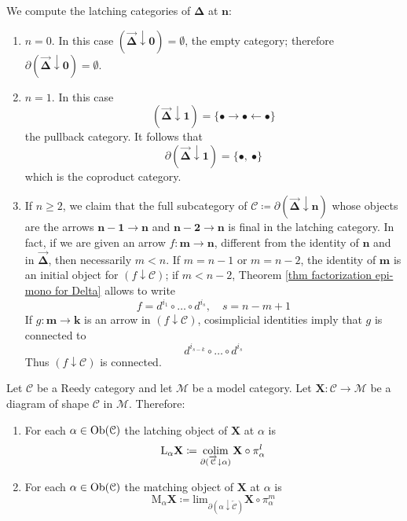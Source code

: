 \begin{refsection}
\begin{eg} \label{eg computing latching categories}
We compute the latching categories of $\boldsymbol\Delta$ at $\mathbf n$:
\begin{enumerate}
\item $n = 0$. In this case $( \overrightarrow{\boldsymbol\Delta} \downarrow \mathbf 0 ) = \emptyset$, the empty category; therefore $\partial (\overrightarrow{\boldsymbol\Delta} \downarrow \mathbf 0) = \emptyset$.
\item $n = 1$. In this case
\[
(\overrightarrow{\boldsymbol\Delta} \downarrow \mathbf 1) = \{\bullet \rightarrow \bullet \leftarrow \bullet \}
\]
the pullback category. It follows that
\[
\partial ( \overrightarrow{ \boldsymbol\Delta} \downarrow \mathbf 1 ) = \{\bullet, \: \bullet \}
\]
which is the coproduct category.
\item If $n \ge 2$, we claim that the full subcategory of $\mathcal C\coloneqq \partial ( \overrightarrow{\boldsymbol\Delta} \downarrow \mathbf n )$ whose objects are the arrows $\mathbf{n-1} \to \mathbf n$ and $\mathbf{n-2} \to \mathbf n$ is final in the latching category. In fact, if we are given an arrow $f \colon \mathbf m \to \mathbf n$, different from the identity of $\mathbf n$ and in $\overrightarrow{\boldsymbol\Delta}$, then necessarily $m < n$. If $m = n - 1$ or $m = n - 2$, the identity of $\mathbf m$ is an initial object for $(f \downarrow \mathcal C)$; if $m < n-2$, Theorem \ref{thm factorization epi-mono for Delta} allows to write
\[
f = d^{i_1} \circ \ldots \circ d^{i_s}, \quad s = n - m + 1
\]
If $g \colon \mathbf m \to \mathbf k$ is an arrow in $(f \downarrow \mathcal C)$, cosimplicial identities imply that $g$ is connected to
\[
d^{i_{s-k}} \circ \ldots \circ d^{i_s}
\]
Thus $(f \downarrow \mathcal C)$ is connected.
\end{enumerate}
\end{eg}

\begin{defin}
Let $\mathcal C$ be a Reedy category and let $\mathcal M$ be a model category. Let $\mathbf X \colon \mathcal C \to \mathcal M$ be a diagram of shape $\mathcal C$ in $\mathcal M$. Therefore:
\begin{enumerate}
\item For each $\alpha \in \operatorname{Ob}(\mathcal C)$ the latching object of $\mathbf X$ at $\alpha$ is
\[
\mathrm L_\alpha \mathbf X\coloneqq \operatorname*{colim}_{\partial ( \overrightarrow{\mathcal C} \downarrow \alpha )} \mathbf X \circ \pi_\alpha^l
\]
\item For each $\alpha \in \operatorname{Ob}(\mathcal C)$ the matching object of $\mathbf X$ at $\alpha$ is
\[
\mathrm M_\alpha \mathbf X\coloneqq \mathrm{lim}_{\partial ( \alpha \downarrow \overleftarrow{\mathcal C} )} \mathbf X \circ \pi_\alpha^m
\]
\end{enumerate}
\end{defin}


\end{refsection}
